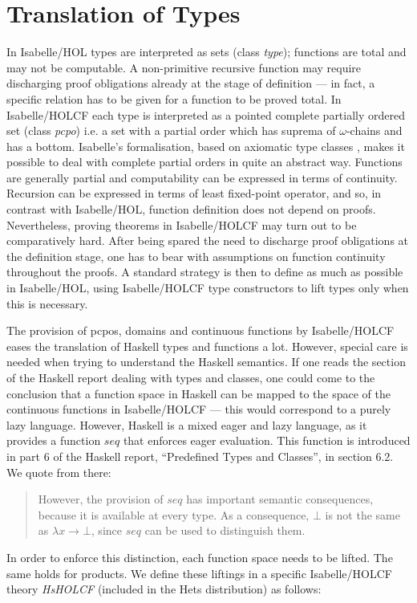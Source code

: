 \documentclass{llncs}
\begin{document}
\section{Translation of Types}
\label{sec:types}


In Isabelle/HOL types are interpreted as sets (class \emph{type});
functions are total and may not be computable. A non-primitive
recursive function may require discharging proof obligations already
at the stage of definition --- in fact, a specific relation has to be
given for a function to be proved total. In Isabelle/HOLCF each type
is interpreted as a pointed complete partially ordered set (class
\emph{pcpo}) i.e. a set with a partial order which has suprema of
$\omega$-chains and has a bottom. Isabelle's formalisation, based on
axiomatic type classes \cite{Wenzel}, makes it possible to deal with
complete partial orders in quite an abstract way.  Functions are
generally partial and computability can be expressed in terms of
continuity. Recursion can be expressed in terms of least fixed-point
operator, and so, in contrast with Isabelle/HOL, function definition
does not depend on proofs.  Nevertheless, proving theorems in
Isabelle/HOLCF may turn out to be comparatively hard.  After being
spared the need to discharge proof obligations at the definition
stage, one has to bear with assumptions on function continuity
throughout the proofs. A standard strategy is then to define as much
as possible in Isabelle/HOL, using Isabelle/HOLCF type constructors to
lift types only when this is necessary.

The provision of pcpos, domains and continuous functions by
Isabelle/HOLCF eases the translation of Haskell types and functions a
lot.  However, special care is needed when trying to understand the
Haskell semantics. If one reads the section of the Haskell report
dealing with types and classes, one could come to the conclusion that
a function space in Haskell can be mapped to the space of the
continuous functions in Isabelle/HOLCF --- this would correspond to a
purely lazy language. However, Haskell is a mixed eager and lazy
language, as it provides a function $seq$ that enforces eager
evaluation. This function is introduced in part 6 of the Haskell
report, ``Predefined Types and Classes'', in section 6.2.  We quote
from there:
\begin{quote}
  However, the provision of $seq$ has important semantic consequences,
  because it is available at every type. As a consequence, $\bot$ is
  not the same as $\lambda x \rightarrow \bot$, since $seq$ can be
  used to distinguish them.
\end{quote}
In order to enforce this distinction, each function space needs to be
lifted. The same holds for products.  We define these liftings in a
specific Isabelle/HOLCF theory \emph{HsHOLCF} (included in the Hets
distribution) as follows:
\end{document}
